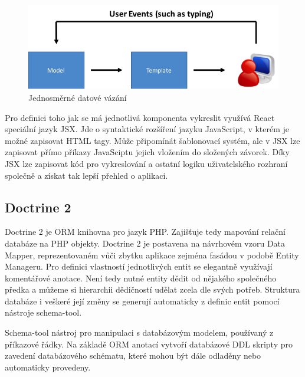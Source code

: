 \documentclass[thesis=B,czech]{FITthesis}[2012/06/26]
\begin{document}
	\begin{figure}
		\includegraphics[width=\textwidth]{databinding2.png}
		\caption{Jednosměrné datové vázání}\label{data_binding}
	\end{figure}

	Pro definici toho jak se má jednotlivá komponenta vykreslit využívá React speciální jazyk JSX. Jde o syntaktické rozšíření jazyku JavaScript, v kterém 	je možné zapisovat HTML tagy. Může připomínát šablonovací systém, ale v JSX lze zapisovat přímo příkazy JavaSciptu jejich vložením do složených závorek. Díky JSX lze zapisovat kód pro vykreslování a ostatní logiku uživatelského rozhraní společně a získat tak lepší přehled o aplikaci.\cite{jsx} 
	
\subsection{Doctrine 2}
	Doctrine 2 je ORM knihovna pro jazyk PHP. Zajišťuje tedy mapování relační databáze na PHP objekty. Doctrine 2 je postavena na návrhovém vzoru Data Mapper, reprezentovaném vůči zbytku aplikace zejména fasádou v podobě Entity Manageru. Pro definici vlastností jednotlivých entit se elegantně využívají komentářové anotace. Není tedy nutné entity dědit od nějakého společného předka a můžeme si hierarchii dědičností udělat zcela dle svých potřeb. Struktura databáze i veškeré její změny se generují automaticky z definic entit pomocí nástroje schema-tool. \cite{doctrine2} 
	
	Schema-tool nástroj pro manipulaci s databázovým modelem, používaný z příkazové řádky. Na základě ORM anotací vytvoří databázové DDL skripty pro zavedení databázového schématu, které mohou být dále odladěny nebo automaticky provedeny.
	
\end{document}
